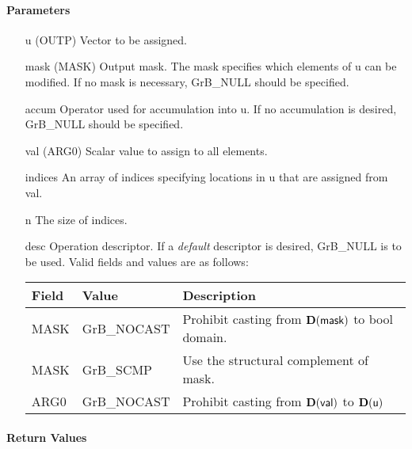 \paragraph{Parameters}

\begin{itemize}[leftmargin=1.1in]
    \item[{\sf u}]   ({\sf OUTP}) Vector to be assigned.

    \item[{\sf mask}] ({\sf MASK}) Output mask. The mask specifies which elements
    of {\sf u} can be modified. If no mask is necessary, {\sf GrB\_NULL} should be specified.

    \item[{\sf accum}] Operator used for accumulation into {\sf u}.  If no accumulation
                        is desired, {\sf GrB\_NULL} should be specified.

    \item[{\sf val}]   ({\sf ARG0}) Scalar value to assign to all elements.
    \item[{\sf indices}]   An array of indices specifying locations in {\sf u} that
                       are assigned from {\sf val}.
    \item[{\sf n}]     The size of {\sf indices}.

    \item[{\sf desc}]   Operation descriptor. If a
    \emph{default} descriptor is desired, {\sf GrB\_NULL} is to be
    used. Valid fields and values are as follows: \\
    \begin{tabular}{lll}
    Field  & Value & Description \\
    \hline
    {\sf MASK} & {\sf GrB\_NOCAST} & Prohibit casting from $\bold{D}({\sf mask})$ to {\sf bool} domain. \\
    {\sf MASK} & {\sf GrB\_SCMP} & Use the structural complement of {\sf mask}. \\
    {\sf ARG0} & {\sf GrB\_NOCAST} & Prohibit casting from $\bold{D}({\sf val})$ to $\bold{D}({\sf u})$ \\
    \end{tabular}

\end{itemize}

\paragraph{Return Values}

